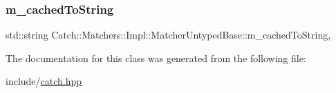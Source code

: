 \subsubsection{\texorpdfstring{m\_cachedToString}{m\_cachedToString}}
{\footnotesize\ttfamily std\+::string Catch\+::\+Matchers\+::\+Impl\+::\+Matcher\+Untyped\+Base\+::m\+\_\+cached\+To\+String\hspace{0.3cm}{\ttfamily [mutable]}, {\ttfamily [protected]}}



The documentation for this class was generated from the following file\+:\begin{DoxyCompactItemize}
\item 
include/\mbox{\hyperlink{catch_8hpp}{catch.\+hpp}}\end{DoxyCompactItemize}
